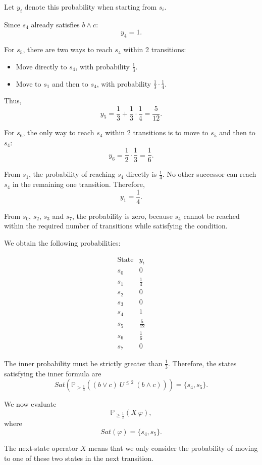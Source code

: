 \documentclass[12pt,a4paper]{article}
\begin{document}
\begin{description}
\begin{enumerate}[label=\alph*)]
Let $y_i$ denote this probability when starting from $s_i$.

Since $s_4$ already satisfies $b\land c$:
\[
y_4=1.
\]


For $s_5$, there are two ways to reach $s_4$ within
2 transitions:
\begin{itemize}
    \item Move directly to $s_4$, with probability $\frac{1}{3}$.
    \item Move to $s_1$ and then to $s_4$, with probability
    $\frac{1}{3}\cdot\frac{1}{4}$.
\end{itemize}

Thus,
\[
y_5=\frac{1}{3}+
\frac{1}{3}\cdot\frac{1}{4}
=\frac{5}{12}.
\]

For $s_6$, the only way to reach $s_4$ within 2 transitions
is to move to $s_5$ and then to $s_4$:
\[
y_6=\frac{1}{2}\cdot\frac{1}{3}
=\frac{1}{6}.
\]

From $s_1$, the probability of reaching $s_4$ directly is
$\frac{1}{4}$. No other successor can reach $s_4$ in the
remaining one transition. Therefore,
\[
y_1=\frac{1}{4}.
\]

From $s_0$, $s_2$, $s_3$ and $s_7$, the probability is zero,
because $s_4$ cannot be reached within the required number
of transitions while satisfying the condition.

We obtain the following probabilities:

\[
\begin{array}{c|c}
\text{State} & y_i\\
\hline
s_0 & 0\\
s_1 & \frac{1}{4}\\
s_2 & 0\\
s_3 & 0\\
s_4 & 1\\
s_5 & \frac{5}{12}\\
s_6 & \frac{1}{6}\\
s_7 & 0
\end{array}
\]

The inner probability must be strictly greater than
$\frac{1}{3}$. Therefore, the states satisfying the inner
formula are
\[
\boxed{
Sat\left(
\mathbb{P}_{>\frac{1}{3}}
\left((b\lor c)\ U^{\leq 2}\ (b\land c)\right)
\right)
=
\{s_4,s_5\}.
}
\]

We now evaluate
\[
\mathbb{P}_{\geq\frac{1}{2}}(X\ \varphi),
\]
where
\[
Sat(\varphi)=\{s_4,s_5\}.
\]

The next-state operator $X$ means that we only consider
the probability of moving to one of these two states in
the next transition.


\end{enumerate}
\end{description}
\end{document}
